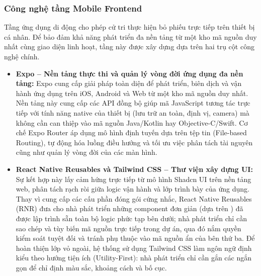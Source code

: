 \subsubsection{Công nghệ tầng Mobile Frontend}

Tầng ứng dụng di động cho phép cử tri thực hiện bỏ phiếu trực tiếp trên thiết bị cá nhân. Để bảo đảm khả năng phát triển đa nền tảng từ một kho mã nguồn duy nhất cùng giao diện linh hoạt, tầng này được xây dựng dựa trên hai trụ cột công nghệ chính.

\begin{itemize}
    \item \textbf{Expo -- Nền tảng thực thi và quản lý vòng đời ứng dụng đa nền tảng:} Expo cung cấp giải pháp toàn diện để phát triển, biên dịch và vận hành ứng dụng trên iOS, Android và Web từ một kho mã nguồn duy nhất. Nền tảng này cung cấp các API đồng bộ giúp mã JavaScript tương tác trực tiếp với tính năng native của thiết bị (lưu trữ an toàn, định vị, camera) mà không cần can thiệp vào mã nguồn Java/Kotlin hay Objective-C/Swift. Cơ chế Expo Router áp dụng mô hình định tuyến dựa trên tệp tin (File-based Routing), tự động hóa luồng điều hướng và tối ưu việc phân tách tài nguyên cũng như quản lý vòng đời của các màn hình.

    \item \textbf{React Native Reusables và Tailwind CSS -- Thư viện xây dựng UI:} Sự kết hợp này lấy cảm hứng trực tiếp từ mô hình Shadcn UI trên nền tảng web, phân tách rạch ròi giữa logic vận hành và lớp trình bày của ứng dụng. Thay vì cung cấp các cấu phần đóng gói cứng nhắc, React Native Reusables (RNR) đưa cho nhà phát triển những component đơn giản (dựa trên ) đã được lập trình sẵn toàn bộ logic phức tạp bên dưới; nhà phát triển chỉ cần sao chép và tùy biến mã nguồn trực tiếp trong dự án, qua đó nắm quyền kiểm soát tuyệt đối và tránh phụ thuộc vào mã nguồn ẩn của bên thứ ba. Để hoàn thiện lớp vỏ ngoài, hệ thống sử dụng Tailwind CSS làm ngôn ngữ định kiểu theo hướng tiện ích (Utility-First): nhà phát triển chỉ cần gắn các  ngắn gọn để chỉ định màu sắc, khoảng cách và bố cục.
\end{itemize}

